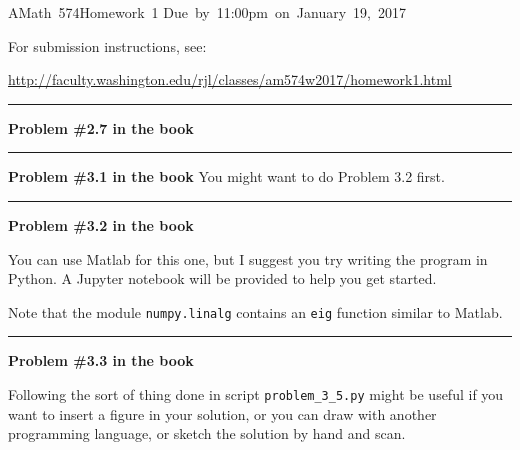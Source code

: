 \documentclass[11pt]{article}
\begin{document}
\hfill\vbox{\hbox{AMath 574}\hbox{Homework 1}
\hbox{Due by 11:00pm on January 19, 2017}}

For submission instructions, see:

\url{http://faculty.washington.edu/rjl/classes/am574w2017/homework1.html}


\vskip 1cm
\hrule
{\bf Problem \#2.7 in the book}





\vskip 1cm
\hrule
{\bf Problem \#3.1 in the book} You might want to do Problem 3.2 first.





\vskip 1cm
\hrule
{\bf Problem \#3.2 in the book}

You can use Matlab for this one, but I suggest you try writing the program 
in Python.  A Jupyter notebook will be provided to help you get started.

Note that the module {\tt numpy.linalg} contains an {\tt eig}
function similar to Matlab.





\vskip 1cm
\hrule
{\bf Problem \#3.3 in the book}

Following the sort of thing done in 
script \verb+problem_3_5.py+ might be useful if you want to insert a
figure in your solution, or you can draw with another programming language, or
sketch the solution by hand and scan.




\end{document}
